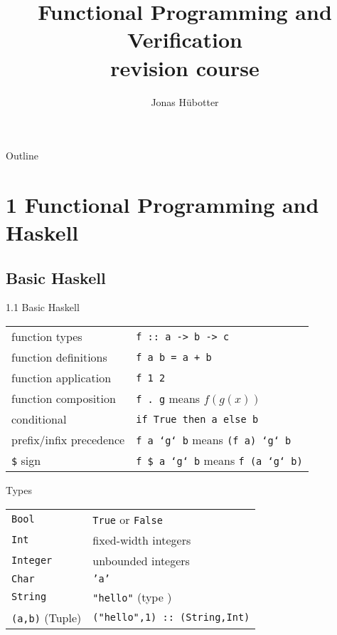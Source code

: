 \documentclass{beamer}
\title[FPV revision course]{Functional Programming and Verification \\ revision course}
\author{Jonas Hübotter}
\def\code#1{\texttt{\frenchspacing#1}}
\begin{document}
\begin{frame}
  \titlepage
\end{frame}

\begin{frame}{Outline}
 \tableofcontents
\end{frame}

\section{1 Functional Programming and Haskell}

\subsection{Basic Haskell}

\begin{frame}{1.1 Basic Haskell}
\begingroup
\setlength{\tabcolsep}{10pt}
\renewcommand{\arraystretch}{1.5}
\begin{tabularx}{\textwidth}{ll}
    function types & \code{f :: a -> b -> c} \\
    function definitions & \code{f a b = a + b} \\
    function application & \code{f 1 2} \\
    function composition & \code{f . g} means $f(g(x))$ \\
    conditional & \code{if True then a else b} \\
    prefix/infix precedence & \code{f a `g` b} means \code{(f a) `g` b} \\
    \code{\$} sign & \code{f \$ a `g` b} means \code{f (a `g` b)} \\
\end{tabularx}
\endgroup

\end{frame}

\begin{frame}{Types}

\begingroup
\setlength{\tabcolsep}{10pt}
\renewcommand{\arraystretch}{1.5}
\begin{tabularx}{\textwidth}{ll}
    \code{Bool} & \code{True} or \code{False} \\
    \code{Int} & fixed-width integers \\
    \code{Integer} & unbounded integers \\
    \code{Char} & \code{'a'} \\
    \code{String} & \code{"hello"} (type \code{[Char]}) \\
    \code{(a,b)} (Tuple) & \code{("hello",1) :: (String,Int)}
\end{tabularx}
\endgroup

\end{frame}
\end{document}
